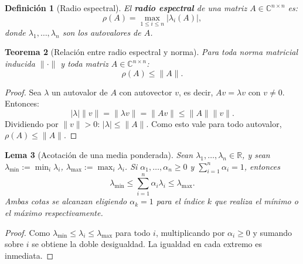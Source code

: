 \documentclass[a4paper,11pt]{report}
\newtheorem{theorem}{Teorema}[chapter]
\newtheorem{lemma}[theorem]{Lema}
\newtheorem{definition}[theorem]{Definición}
\begin{document}
\begin{definition}[Radio espectral]
El \textbf{radio espectral} de una matriz $A \in \mathbb{C}^{n \times n}$ es:
\[
\rho(A) = \max_{1 \leq i \leq n} |\lambda_i(A)|,
\]
donde $\lambda_1, \ldots, \lambda_n$ son los autovalores de $A$.
\end{definition}

\begin{theorem}[Relación entre radio espectral y norma]\label{thm:radio_espectral_norma}
Para toda norma matricial inducida $\|\cdot\|$ y toda matriz $A \in \mathbb{C}^{n \times n}$:
\[
\rho(A) \leq \|A\|.
\]
\end{theorem}

\begin{proof}
Sea $\lambda$ un autovalor de $A$ con autovector $v$, es decir, $Av = \lambda v$ con $v \neq 0$. Entonces:
\[
|\lambda| \|v\| = \|\lambda v\| = \|Av\| \leq \|A\| \|v\|.
\]
Dividiendo por $\|v\| > 0$: $|\lambda| \leq \|A\|$. Como esto vale para todo autovalor, $\rho(A) \leq \|A\|$.
\end{proof}

\begin{lemma}[Acotación de una media ponderada]\label{lem:suma_ponderada_max}
Sean $\lambda_1,\ldots,\lambda_n\in\mathbb{R}$, y sean $\lambda_{\min}:=\min_i\lambda_i$, $\lambda_{\max}:=\max_i \lambda_i$. Si $\alpha_1,\ldots,\alpha_n\ge 0$ y $\sum_{i=1}^n \alpha_i=1$, entonces
\[
\lambda_{\min}\le\sum_{i=1}^n \alpha_i\lambda_i\le \lambda_{\max}.
\]
Ambas cotas se alcanzan eligiendo $\alpha_k=1$ para el índice $k$ que realiza el mínimo o el máximo respectivamente.
\end{lemma}

\begin{proof}
Como $\lambda_{\min}\le\lambda_i\le\lambda_{\max}$ para todo $i$, multiplicando por $\alpha_i\ge 0$ y sumando sobre $i$ se obtiene la doble desigualdad. La igualdad en cada extremo es inmediata.
\end{proof}
\end{document}
